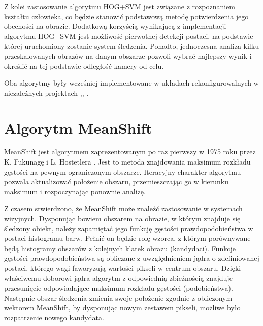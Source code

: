 Z kolei zastosowanie algorytmu HOG+SVM jest związane z rozpoznaniem kształtu człowieka, co będzie stanowić podstawową metodę potwierdzenia jego obecności na obrazie. Dodatkową korzyścią wynikającą z implementacji algorytmu HOG+SVM jest możliwość pierwotnej detekcji postaci, na podstawie której uruchomiony zostanie system śledzenia. 
Ponadto, jednoczesna analiza kilku przeskalowanych obrazów na danym obszarze pozwoli wybrać najlepszy wynik i określić na tej podstawie odległość kamery od celu.  %

Oba algorytmy były wcześniej implementowane w układach rekonfigurowalnych w niezależnych projektach \cite{Mazur},\cite{Patel}, \cite{Drozdz}.

\section{Algorytm MeanShift}

MeanShift jest algorytmem zaprezentowanym po raz pierwszy w 1975 roku przez K. Fukunagę i L. Hostetlera \cite{Fukunaga}. 
Jest to metoda znajdowania maksimum rozkładu gęstości na pewnym ograniczonym obszarze. 
Iteracyjny charakter algorytmu pozwala aktualizować położenie obszaru, przemieszczając go w kierunku maksimum i rozpoczynając ponownie analizę.

Z czasem stwierdzono, że MeanShift może znaleźć zastosowanie w systemach wizyjnych. Dysponując bowiem obszarem na obrazie, w którym znajduje się śledzony obiekt, należy zapamiętać jego funkcję gęstości prawdopodobieństwa w postaci histogramu barw.
Pełnić on będzie rolę wzorca, z którym porównywane będą histogramy obszarów z kolejnych klatek obrazu (kandydaci).
Funkcje gęstości prawdopodobieństwa są obliczane z uwzględnieniem jądra o zdefiniowanej postaci, którego wagi faworyzują wartości pikseli w centrum obszaru. 
Dzięki właściwemu doborowi jądra algorytm z odpowiednią zbieżnością znajduje przesunięcie odpowiadające maksimum rozkładu gęstości (podobieństwa). Następnie obszar śledzenia zmienia swoje położenie zgodnie z obliczonym wektorem MeanShift, by dysponując nowym zestawem pikseli, możliwe było rozpatrzenie nowego kandydata.

